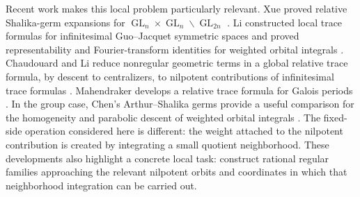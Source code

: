 \documentclass[11pt]{amsart}
\theoremstyle{definition}
\theoremstyle{remark}
\newcommand{\GL}{\operatorname{GL}}
\begin{document}
Recent work makes this local problem particularly relevant.  Xue proved
relative Shalika-germ expansions for
$\GL_n\times\GL_n\backslash\GL_{2n}$ \cite{Xue}.  Li constructed local
trace formulas for infinitesimal Guo--Jacquet symmetric spaces and proved
representability and Fourier-transform identities for weighted orbital
integrals \cite{LiLocal,LiFourier}.  Chaudouard and Li reduce nonregular
geometric terms in a global relative trace formula, by descent to
centralizers, to nilpotent contributions of infinitesimal trace formulas
\cite{ChaudouardLi}.  Mahendraker develops a relative trace formula for
Galois periods \cite{Mahendraker}.  In the group case, Chen's
Arthur--Shalika germs provide a useful comparison for the homogeneity and
parabolic descent of weighted orbital integrals \cite{ChenWeighted}.  The
fixed-side operation considered here is different:
the weight attached to the nilpotent contribution is created by integrating a
small quotient neighborhood.  These developments also highlight a concrete local task:
construct rational regular families approaching the relevant nilpotent orbits
and coordinates in which that neighborhood integration can be carried out.
\end{document}
